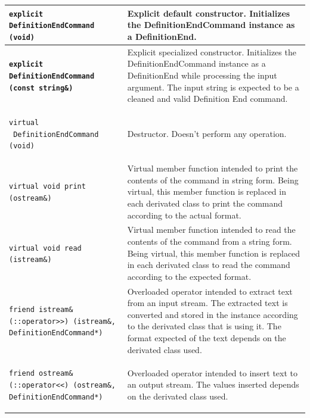 \documentclass[11pt,twoside,openany,x11names,svgnames]{memoir}
\begin{document}
\begin{table}[h]\footnotesize
\centering
\begin{tabular}{| >{\bfseries}p{8.5cm} | p{7cm} |}
	\hline
	
	\texttt{explicit DefinitionEndCommand (void)} & Explicit default constructor. Initializes the DefinitionEndCommand instance as a DefinitionEnd. \\
	
	\hline
	
	\texttt{explicit DefinitionEndCommand (const string\&)} & Explicit specialized constructor. Initializes the DefinitionEndCommand instance as a DefinitionEnd while processing the input argument. The input string is expected to be a cleaned and valid Definition End command. \\
	
	\hline
	
	\texttt{virtual ~DefinitionEndCommand (void)} & Destructor. Doesn't perform any operation. \\
	
	\hline
	
	\texttt{virtual void print (ostream\&)} & Virtual member function intended to print the contents of the command in string form. Being virtual, this member function is replaced in each derivated class to print the command according to the actual format. \\
	
	\hline
	
	\texttt{virtual void read (istream\&)} & Virtual member function intended to read the contents of the command from a string form. Being virtual, this member function is replaced in each derivated class to read the command according to the expected format. \\
	
	\hline	
		
	\texttt{friend istream\& (::operator>>) (istream\&, DefinitionEndCommand*)} & Overloaded operator intended to extract text from an input stream. The extracted text is converted and stored in the instance according to the derivated class that is using it. The format expected of the text depends on the derivated class used. \\
	
	\hline
	
	\texttt{friend ostream\& (::operator<<) (ostream\&, DefinitionEndCommand*)} & Overloaded operator intended to insert text to an output stream. The values inserted depends on the derivated class used. \\
	

\end{tabular}
\end{table}
\end{document}
